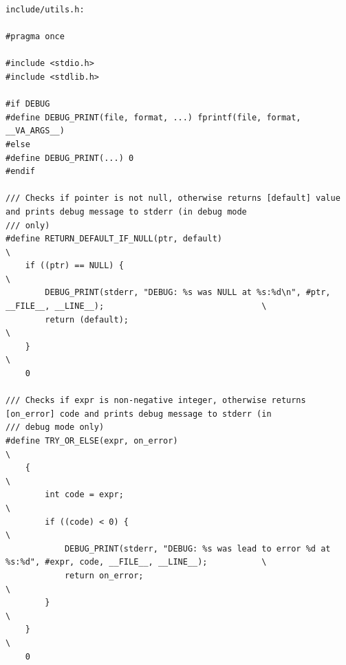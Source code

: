 \begin{verbatim}
include/utils.h:

#pragma once

#include <stdio.h>
#include <stdlib.h>

#if DEBUG
#define DEBUG_PRINT(file, format, ...) fprintf(file, format, __VA_ARGS__)
#else
#define DEBUG_PRINT(...) 0
#endif

/// Checks if pointer is not null, otherwise returns [default] value and prints debug message to stderr (in debug mode
/// only)
#define RETURN_DEFAULT_IF_NULL(ptr, default)                                                                           \
    if ((ptr) == NULL) {                                                                                               \
        DEBUG_PRINT(stderr, "DEBUG: %s was NULL at %s:%d\n", #ptr, __FILE__, __LINE__);                                \
        return (default);                                                                                              \
    }                                                                                                                  \
    0

/// Checks if expr is non-negative integer, otherwise returns [on_error] code and prints debug message to stderr (in
/// debug mode only)
#define TRY_OR_ELSE(expr, on_error)                                                                                    \
    {                                                                                                                  \
        int code = expr;                                                                                               \
        if ((code) < 0) {                                                                                              \
            DEBUG_PRINT(stderr, "DEBUG: %s was lead to error %d at %s:%d", #expr, code, __FILE__, __LINE__);           \
            return on_error;                                                                                           \
        }                                                                                                              \
    }                                                                                                                  \
    0


\end{verbatim}
